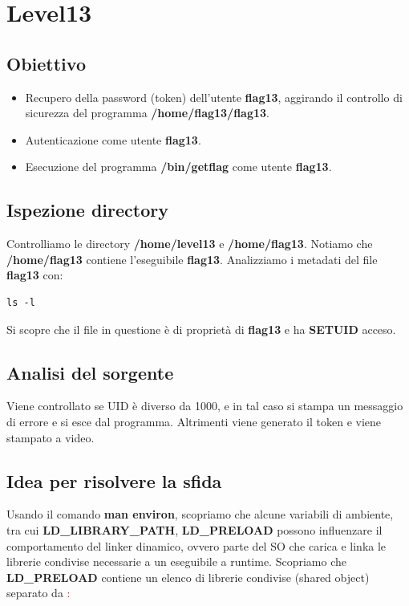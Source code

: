 \section{Level13}
\subsection{Obiettivo}
\begin{itemize}
    \item Recupero della password (token) dell’utente \textbf{flag13}, aggirando il controllo di sicurezza del programma \textbf{/home/flag13/flag13}.
    \item Autenticazione come utente \textbf{flag13}.
    \item Esecuzione del programma \textbf{/bin/getflag} come utente \textbf{flag13}.
\end{itemize}

\subsection{Ispezione directory}
Controlliamo le directory \textbf{/home/level13} e \textbf{/home/flag13}. Notiamo che \textbf{/home/flag13} contiene l’eseguibile \textbf{flag13}.
Analizziamo i metadati del file \textbf{flag13} con: 
\begin{lstlisting}[style=bashstyle]
    ls -l
\end{lstlisting}
Si scopre che il file in questione è di proprietà di \textbf{flag13} e ha \textbf{SETUID} acceso.

\subsection{Analisi del sorgente}
Viene controllato se UID è diverso da 1000, e in tal caso si stampa un messaggio di errore e si esce dal programma.
Altrimenti viene generato il token e viene stampato a video.

\subsection{Idea per risolvere la sfida}
Usando il comando \textbf{man environ}, scopriamo che alcune variabili di ambiente, tra cui \textbf{LD\_LIBRARY\_PATH}, \textbf{LD\_PRELOAD} possono influenzare il comportamento del linker dinamico, ovvero parte del SO che carica e linka le librerie condivise necessarie a un eseguibile a runtime. 
Scopriamo che \textbf{LD\_PRELOAD} contiene un elenco di librerie condivise (shared object) separato da \textcolor{red}{:}

